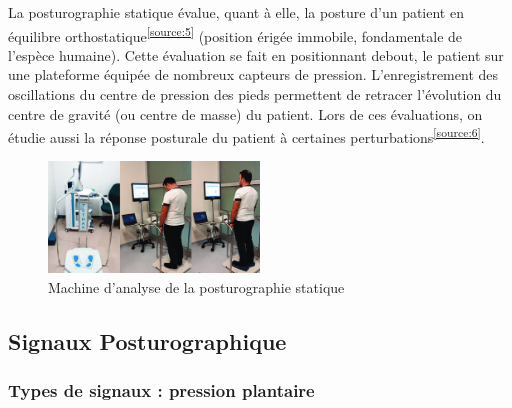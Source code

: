 La posturographie statique évalue, quant à elle, la posture d’un patient en équilibre orthostatique\textsuperscript{\ref{source:5}} (position érigée immobile, fondamentale de l'espèce humaine). 
Cette évaluation se fait en positionnant debout, le patient sur une plateforme équipée de nombreux capteurs de pression. 
L’enregistrement des oscillations du centre de pression des pieds permettent de retracer l'évolution du centre de gravité (ou centre de masse) du patient. 
Lors de ces évaluations, on étudie aussi la réponse posturale du patient à certaines perturbations\textsuperscript{\ref{source:6}}.

\begin{figure}[H]                                                                                                                                                                                                             
  \centering
  \includegraphics[width=0.5\textwidth]{images/introduction/statique.png}
  \caption{Machine d’analyse de la posturographie statique }
  \label{fig:posturographie-statique}
\end{figure}

\subsection{Signaux Posturographique}


\subsubsection{Types de signaux : pression plantaire}

